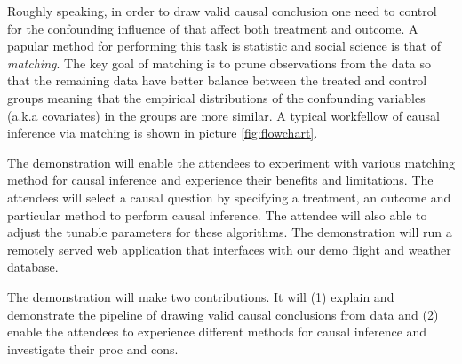 \vspace{-2mm}
Roughly speaking, in order to draw valid causal conclusion one need to control for the
confounding influence of that affect both treatment and outcome. A papular method for 
performing this task is statistic and social science is that of {\em matching}.
The key goal of matching is to prune observations from the data so that
the remaining data have better balance between the treated and control groups meaning that the empirical
distributions of the confounding variables (a.k.a covariates) in the groups are more similar. A typical workfellow of causal inference via matching is shown in picture \ref{fig:flowchart}. 

The demonstration will enable the attendees to experiment with various matching method for causal inference and experience their benefits and limitations.
The attendees will select a causal question by specifying a treatment,
  an outcome and particular method to perform causal inference.
The attendee will also able to adjust the tunable parameters for these algorithms.
The demonstration will run a remotely served web application that interfaces with our demo flight and weather database.

The demonstration will make two contributions. It will
  (1) explain and demonstrate the pipeline of drawing valid causal conclusions from data and
  (2) enable the attendees to experience different methods for causal inference and investigate their proc and cons.
